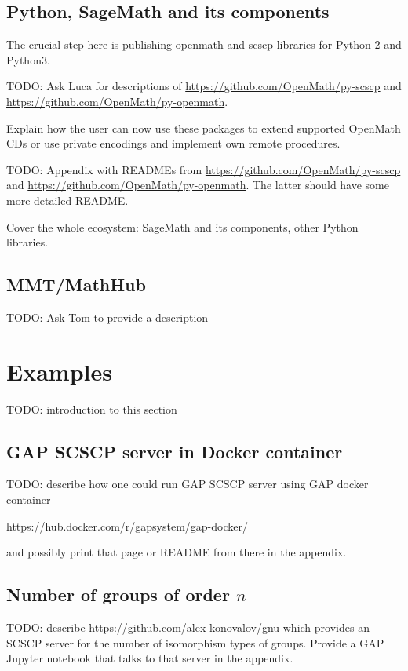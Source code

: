 \documentclass{deliverablereport}
\begin{document}
\subsection{Python, SageMath and its components}

The crucial step here is publishing {\sf openmath} and {\sf scscp} libraries
for Python 2 and Python3.

TODO: Ask Luca for descriptions of \url{https://github.com/OpenMath/py-scscp}
and \url{https://github.com/OpenMath/py-openmath}. 

Explain how the user can now use these packages to extend supported OpenMath CDs
or use private encodings and implement own remote procedures.

TODO: Appendix with READMEs from \url{https://github.com/OpenMath/py-scscp}
and \url{https://github.com/OpenMath/py-openmath}. The latter should have
some more detailed README.

Cover the whole ecosystem: SageMath and its components, other Python libraries.


\subsection{MMT/MathHub}

TODO: Ask Tom to provide a description



\section{Examples}\label{examples}

TODO: introduction to this section


\subsection{GAP SCSCP server in Docker container}

TODO: describe how one could run GAP SCSCP server
using GAP docker container 

https://hub.docker.com/r/gapsystem/gap-docker/ 

and possibly print that page or README from there in the appendix.


\subsection{Number of groups of order $n$}\label{gnu-reproducibility}

TODO: describe \url{https://github.com/alex-konovalov/gnu} which provides
an SCSCP server for the number of isomorphism types of groups. Provide
a GAP Jupyter notebook that talks to that server in the appendix.
\end{document}
